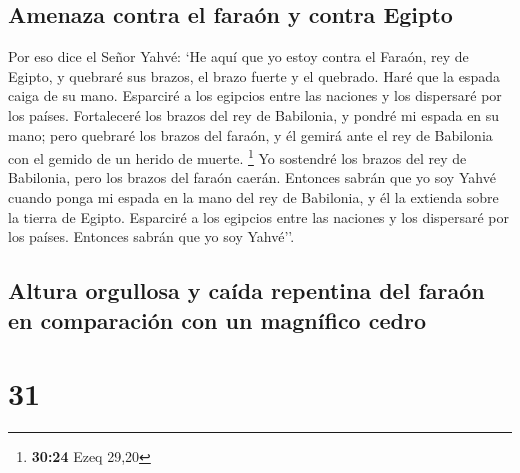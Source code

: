 \hypertarget{amenaza-contra-el-farauxf3n-y-contra-egipto}{%
\subsection{Amenaza contra el faraón y contra
Egipto}\label{amenaza-contra-el-farauxf3n-y-contra-egipto}}

 Por eso dice el Señor Yahvé: `He aquí que yo estoy
contra el Faraón, rey de Egipto, y quebraré sus brazos, el brazo fuerte
y el quebrado. Haré que la espada caiga de su mano. 
Esparciré a los egipcios entre las naciones y los dispersaré por los
países.  Fortaleceré los brazos del rey de Babilonia, y
pondré mi espada en su mano; pero quebraré los brazos del faraón, y él
gemirá ante el rey de Babilonia con el gemido de un herido de muerte.
\footnote{\textbf{30:24} Ezeq 29,20}  Yo sostendré los
brazos del rey de Babilonia, pero los brazos del faraón caerán. Entonces
sabrán que yo soy Yahvé cuando ponga mi espada en la mano del rey de
Babilonia, y él la extienda sobre la tierra de Egipto. 
Esparciré a los egipcios entre las naciones y los dispersaré por los
países. Entonces sabrán que yo soy Yahvé''.

\hypertarget{altura-orgullosa-y-cauxedda-repentina-del-farauxf3n-en-comparaciuxf3n-con-un-magnuxedfico-cedro}{%
\subsection{Altura orgullosa y caída repentina del faraón en comparación
con un magnífico
cedro}\label{altura-orgullosa-y-cauxedda-repentina-del-farauxf3n-en-comparaciuxf3n-con-un-magnuxedfico-cedro}}

\hypertarget{section-30}{%
\section{31}\label{section-30}}

